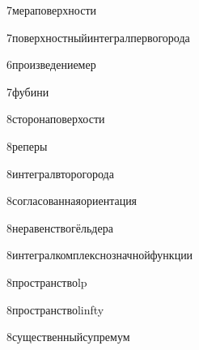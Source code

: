 {7}{мераповерхности}

{7}{поверхностныйинтегралпервогорода}

{6}{произведениемер}

{7}{фубини}

{8}{сторонаповерхости}

{8}{реперы}

{8}{интегралвторогорода}

{8}{согласованнаяориентация}

{8}{неравенствогёльдера}

{8}{интегралкомплекснозначнойфункции}

{8}{пространствоlp}

{8}{пространствоlinfty}

{8}{существенныйсупремум}














